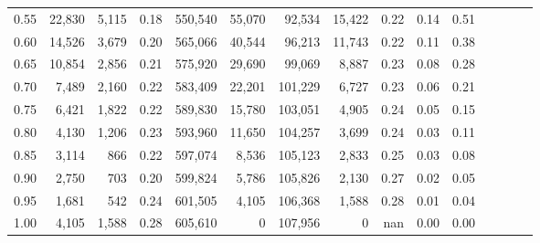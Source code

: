 \begin{tabular}{rrrcrrrrrrrrrrr}
0.55 &   22,830 &   5,115 &                                       0.18 &  550,540 &   55,070 &   92,534 &   15,422 &  0.22 &  0.14 &                         0.51 \\
0.60 &   14,526 &   3,679 &                                       0.20 &  565,066 &   40,544 &   96,213 &   11,743 &  0.22 &  0.11 &                         0.38 \\
0.65 &   10,854 &   2,856 &                                       0.21 &  575,920 &   29,690 &   99,069 &    8,887 &  0.23 &  0.08 &                         0.28 \\
0.70 &    7,489 &   2,160 &                                       0.22 &  583,409 &   22,201 &  101,229 &    6,727 &  0.23 &  0.06 &                         0.21 \\
0.75 &    6,421 &   1,822 &                                       0.22 &  589,830 &   15,780 &  103,051 &    4,905 &  0.24 &  0.05 &                         0.15 \\
0.80 &    4,130 &   1,206 &                                       0.23 &  593,960 &   11,650 &  104,257 &    3,699 &  0.24 &  0.03 &                         0.11 \\
0.85 &    3,114 &     866 &                                       0.22 &  597,074 &    8,536 &  105,123 &    2,833 &  0.25 &  0.03 &                         0.08 \\
0.90 &    2,750 &     703 &                                       0.20 &  599,824 &    5,786 &  105,826 &    2,130 &  0.27 &  0.02 &                         0.05 \\
0.95 &    1,681 &     542 &                                       0.24 &  601,505 &    4,105 &  106,368 &    1,588 &  0.28 &  0.01 &                         0.04 \\
1.00 &    4,105 &   1,588 &                                       0.28 &  605,610 &        0 &  107,956 &        0 &   nan &  0.00 &                         0.00 \\
\bottomrule
\end{tabular}

